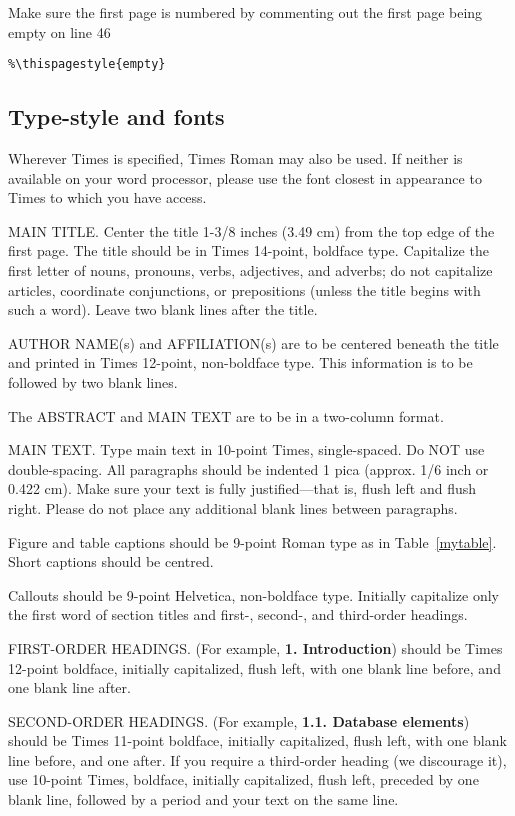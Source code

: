 \documentclass[10pt,twocolumn,letterpaper]{article}
\begin{document}
Make sure the first page is numbered by commenting out the first page being
empty on line 46
\begin{verbatim}
%\thispagestyle{empty}
\end{verbatim}


\subsection{Type-style and fonts}

Wherever Times is specified, Times Roman may also be used. If neither is
available on your word processor, please use the font closest in
appearance to Times to which you have access.

MAIN TITLE. Center the title 1-3/8 inches (3.49 cm) from the top edge of
the first page. The title should be in Times 14-point, boldface type.
Capitalize the first letter of nouns, pronouns, verbs, adjectives, and
adverbs; do not capitalize articles, coordinate conjunctions, or
prepositions (unless the title begins with such a word). Leave two blank
lines after the title.

AUTHOR NAME(s) and AFFILIATION(s) are to be centered beneath the title
and printed in Times 12-point, non-boldface type. This information is to
be followed by two blank lines.

The ABSTRACT and MAIN TEXT are to be in a two-column format.

MAIN TEXT. Type main text in 10-point Times, single-spaced. Do NOT use
double-spacing. All paragraphs should be indented 1 pica (approx. 1/6
inch or 0.422 cm). Make sure your text is fully justified---that is,
flush left and flush right. Please do not place any additional blank
lines between paragraphs.

Figure and table captions should be 9-point Roman type as in
Table~\ref{mytable}. Short captions should be centred.

\noindent Callouts should be 9-point Helvetica, non-boldface type.
Initially capitalize only the first word of section titles and first-,
second-, and third-order headings.

FIRST-ORDER HEADINGS. (For example, {\large \bf 1. Introduction})
should be Times 12-point boldface, initially capitalized, flush left,
with one blank line before, and one blank line after.

SECOND-ORDER HEADINGS. (For example, { \bf 1.1. Database elements})
should be Times 11-point boldface, initially capitalized, flush left,
with one blank line before, and one after. If you require a third-order
heading (we discourage it), use 10-point Times, boldface, initially
capitalized, flush left, preceded by one blank line, followed by a period
and your text on the same line.
\end{document}
